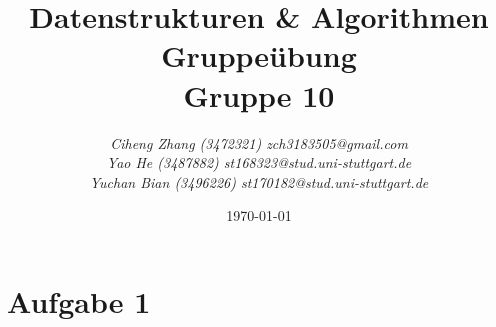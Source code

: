 \documentclass{article}
\begin{document}
\begin{titlepage}
    \title{\Huge \textbf{Datenstrukturen \& Algorithmen Gruppeübung\\Gruppe 10} }
    \author{\LARGE \textsl{Ciheng Zhang (3472321) zch3183505@gmail.com}\\\LARGE \textsl{Yao He (3487882) st168323@stud.uni-stuttgart.de}\\\LARGE \textsl{Yuchan Bian (3496226) st170182@stud.uni-stuttgart.de} \\[200pt]}
    \date{\today}
    \maketitle
    \thispagestyle{empty}
\end{titlepage}
\newpage
\section{Aufgabe 1}
\end{document}
